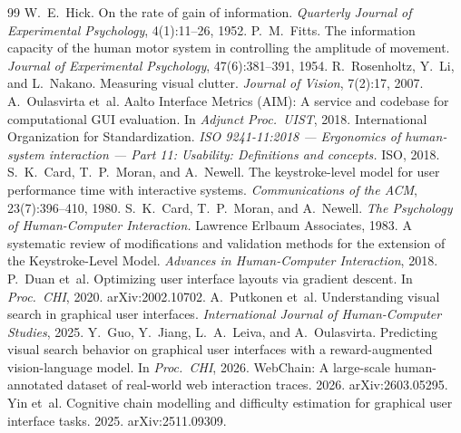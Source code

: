 \documentclass[11pt,a4paper]{article}
\begin{document}
\begin{thebibliography}{99}
\small
{} W.~E.~Hick. On the rate of gain of information. \emph{Quarterly Journal of Experimental Psychology}, 4(1):11--26, 1952.
 P.~M.~Fitts. The information capacity of the human motor system in controlling the amplitude of movement. \emph{Journal of Experimental Psychology}, 47(6):381--391, 1954.
 R.~Rosenholtz, Y.~Li, and L.~Nakano. Measuring visual clutter. \emph{Journal of Vision}, 7(2):17, 2007.
 A.~Oulasvirta et~al. Aalto Interface Metrics (AIM): A service and codebase for computational GUI evaluation. In \emph{Adjunct Proc.\ UIST}, 2018.
 International Organization for Standardization. \emph{ISO 9241-11:2018 --- Ergonomics of human-system interaction --- Part 11: Usability: Definitions and concepts.} ISO, 2018.
 S.~K.~Card, T.~P.~Moran, and A.~Newell. The keystroke-level model for user performance time with interactive systems. \emph{Communications of the ACM}, 23(7):396--410, 1980.
 S.~K.~Card, T.~P.~Moran, and A.~Newell. \emph{The Psychology of Human-Computer Interaction.} Lawrence Erlbaum Associates, 1983.
 A systematic review of modifications and validation methods for the extension of the Keystroke-Level Model. \emph{Advances in Human-Computer Interaction}, 2018.
 P.~Duan et~al. Optimizing user interface layouts via gradient descent. In \emph{Proc.\ CHI}, 2020. arXiv:2002.10702.
 A.~Putkonen et~al. Understanding visual search in graphical user interfaces. \emph{International Journal of Human-Computer Studies}, 2025.
 Y.~Guo, Y.~Jiang, L.~A.~Leiva, and A.~Oulasvirta. Predicting visual search behavior on graphical user interfaces with a reward-augmented vision-language model. In \emph{Proc.\ CHI}, 2026.
 WebChain: A large-scale human-annotated dataset of real-world web interaction traces. 2026. arXiv:2603.05295.
 Yin et~al. Cognitive chain modelling and difficulty estimation for graphical user interface tasks. 2025. arXiv:2511.09309.
\end{thebibliography}
\end{document}
